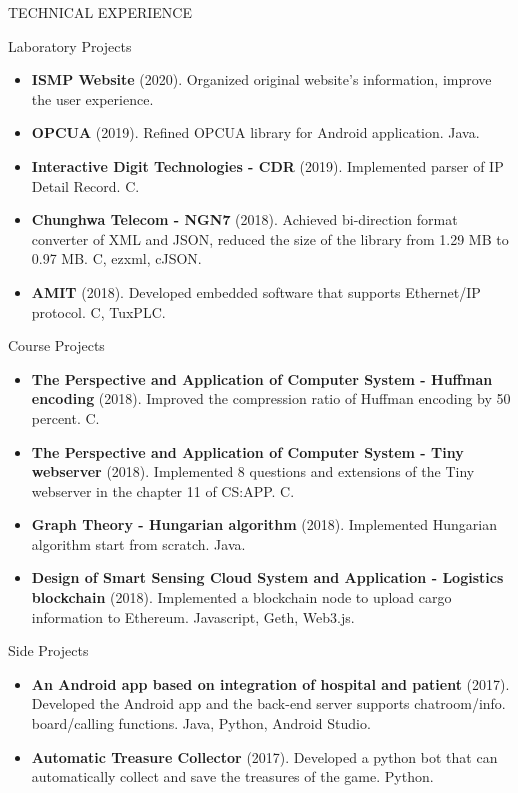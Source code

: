 \documentclass[]{mcdowellcv}
\begin{document}
	\begin{cvsection}{TECHNICAL EXPERIENCE}
		\begin{cvsubsection}{Laboratory Projects}{}{}
			\begin{itemize}
				\item \textbf{ISMP Website} (2020). Organized original website's information, improve the user experience.
				\item \textbf{OPCUA} (2019). Refined OPCUA library for Android application. Java.
				\item \textbf{Interactive Digit Technologies - CDR} (2019). Implemented parser of IP Detail Record. C.
				\item \textbf{Chunghwa Telecom - NGN7} (2018). Achieved bi-direction format converter of XML and JSON, reduced the size of the library from 1.29 MB to 0.97 MB. C, ezxml, cJSON.
				\item \textbf{AMIT} (2018). Developed embedded software that supports Ethernet/IP protocol. C, TuxPLC.
			\end{itemize}
		\end{cvsubsection}
		
		\begin{cvsubsection}{Course Projects}{}{}
			\begin{itemize}
				\item \textbf{The Perspective and Application of Computer System - Huffman encoding} (2018). Improved the compression ratio of Huffman encoding by 50 percent. C.
				\item \textbf{The Perspective and Application of Computer System - Tiny webserver} (2018). Implemented 8 questions and extensions of the Tiny webserver in the chapter 11 of CS:APP. C.
				\item \textbf{Graph Theory - Hungarian algorithm} (2018). Implemented Hungarian algorithm start from scratch. Java.
				\item \textbf{Design of Smart Sensing Cloud System and Application - Logistics blockchain } (2018). Implemented a blockchain node to upload cargo information to Ethereum. Javascript, Geth, Web3.js.
			\end{itemize}
		\end{cvsubsection}
		
		\begin{cvsubsection}{Side Projects}{}{}
			\begin{itemize}
				\item \textbf{An Android app based on integration of hospital and patient} (2017). Developed the Android app and the back-end server supports chatroom/info. board/calling functions. Java, Python, Android Studio.
				\item \textbf{Automatic Treasure Collector} (2017). Developed a python bot that can automatically collect and save the treasures of the game. Python.
			\end{itemize}
		\end{cvsubsection}
	\end{cvsection}
	
\end{document}
